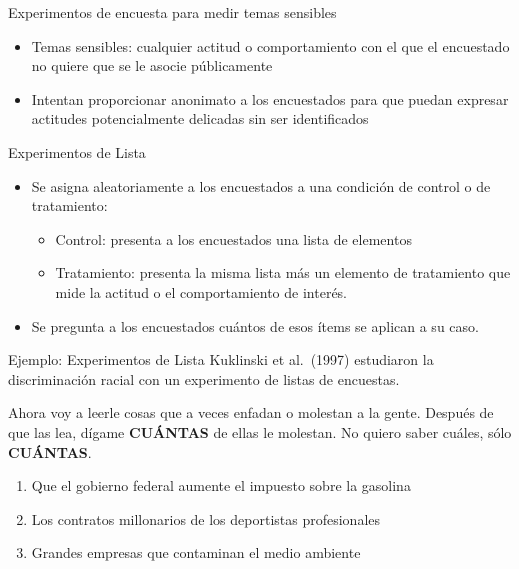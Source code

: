 \documentclass[
  ignorenonframetext,
]{beamer}
\providecommand{\tightlist}{%
  \setlength{\itemsep}{0pt}\setlength{\parskip}{0pt}}
\begin{document}
\begin{frame}{Experimentos de encuesta para medir temas sensibles}
\protect\hypertarget{experimentos-de-encuesta-para-medir-temas-sensibles}{}
\begin{itemize}
\tightlist
\item
  Temas sensibles: cualquier actitud o comportamiento con el que el
  encuestado no quiere que se le asocie públicamente
\item
  Intentan proporcionar anonimato a los encuestados para que puedan
  expresar actitudes potencialmente delicadas sin ser identificados
\end{itemize}
\end{frame}

\begin{frame}{Experimentos de Lista}
\protect\hypertarget{experimentos-de-lista}{}
\begin{itemize}
\tightlist
\item
  Se asigna aleatoriamente a los encuestados a una condición de control
  o de tratamiento:

  \begin{itemize}
  \tightlist
  \item
    Control: presenta a los encuestados una lista de elementos
  \item
    Tratamiento: presenta la misma lista más un elemento de tratamiento
    que mide la actitud o el comportamiento de interés.
  \end{itemize}
\item
  Se pregunta a los encuestados cuántos de esos ítems se aplican a su
  caso.
\end{itemize}
\end{frame}

\begin{frame}{Ejemplo: Experimentos de Lista}
\protect\hypertarget{ejemplo-experimentos-de-lista}{}
Kuklinski et al.~(1997) estudiaron la discriminación racial con un
experimento de listas de encuestas.

Ahora voy a leerle cosas que a veces enfadan o molestan a la gente.
Después de que las lea, dígame \textbf{CUÁNTAS} de ellas le molestan. No
quiero saber cuáles, sólo \textbf{CUÁNTAS}.

\begin{enumerate}
\tightlist
\item
  Que el gobierno federal aumente el impuesto sobre la gasolina
\item
  Los contratos millonarios de los deportistas profesionales
\item
  Grandes empresas que contaminan el medio ambiente
\end{enumerate}
\end{frame}
\end{document}
